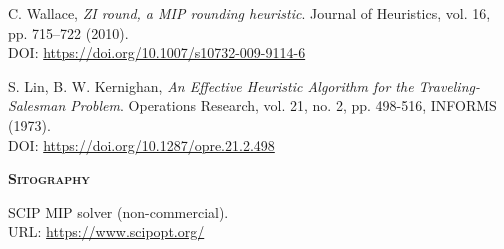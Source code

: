 \documentclass[a4paper,12pt]{book}
\begin{document}
\nocite{*}
\renewcommand{\bibname}{References}
\begin{thebibliography}{9}
	
	 C. Wallace, \textit{ZI round, a MIP rounding heuristic}. Journal of Heuristics, vol. 16, pp. 715–722 (2010). \\ DOI: \url{https://doi.org/10.1007/s10732-009-9114-6}

	 S. Lin, B. W. Kernighan, \textit{An Effective Heuristic Algorithm for the Traveling-Salesman Problem}. Operations Research, vol. 21, no. 2, pp. 498-516, INFORMS (1973). \\ DOI: \url{https://doi.org/10.1287/opre.21.2.498}
	
	\vspace{0.5cm}
	\textsc{\Large \textbf{Sitography}}
	
	 SCIP MIP solver (non-commercial). \\ URL: \url{https://www.scipopt.org/}
	
\end{thebibliography}
\end{document}
